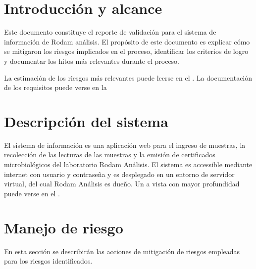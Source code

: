 \documentclass[letterpaper,10pt,spanish]{sphinxmanual}
\begin{document}
\section{Introducción y alcance}
\label{\detokenize{requerimientos/resumen_validacion:introduccion-y-alcance}}
Este documento constituye el reporte de validación para el sistema de
información de Rodam análisis. El propósito de este documento es
explicar cómo se mitigaron los riesgos implicados en el proceso,
identificar los criterios de logro y documentar los hitos más
relevantes durante el proceso.

La estimación de los riesgos más relevantes puede leerse en el . La documentación de los requisitos puede verse en la


\section{Descripción del sistema}
\label{\detokenize{requerimientos/resumen_validacion:descripcion-del-sistema}}
El sistema de información es una aplicación web para el
ingreso de muestras, la recolección de las lecturas de las muestras
y la emisión de certificados microbiológicos del laboratorio
Rodam Análisis. El sistema es accessible mediante internet
con usuario y contraseña y es desplegado en un entorno de
servidor virtual, del cual Rodam Análisis es dueño. Un
a vista con mayor profundidad puede verse en el .


\section{Manejo de riesgo}
\label{\detokenize{requerimientos/resumen_validacion:manejo-de-riesgo}}
En esta sección se describirán las acciones de mitigación de riesgos
empleadas para los riesgos identificados.
\end{document}
